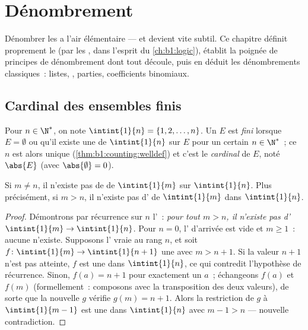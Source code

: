 \chapter{Dénombrement}\label{ch:b1:counting}

Dénombrer les  a l'air élémentaire --- et devient vite
subtil. Ce chapitre définit proprement le  (par les ,
dans l'esprit du \cref{ch:b1:logic}), établit la poignée de principes de
dénombrement dont tout découle, puis en déduit les dénombrements
classiques~: listes, , parties, coefficients binomiaux.

\section{Cardinal des ensembles finis}

\begin{definition}\label{def:b1:counting:card}
Pour $n \in \N^*$, on note $\intint{1}{n} = \{1, 2, \dots,
n\}$. Un  $E$ est \emph{fini} lorsque $E = \emptyset$
ou qu'il existe une  de $\intint{1}{n}$ sur $E$ pour
un certain $n \in \N^*$~; ce $n$ est alors unique (\cref{thm:b1:counting:welldef})
et c'est le \emph{cardinal} de $E$, noté
$\abs{E}$ (avec $\abs{\emptyset} = 0$).
\end{definition}

\begin{theorem}\label{thm:b1:counting:welldef}
Si $m \neq n$, il n'existe pas de  de $\intint{1}{m}$
sur $\intint{1}{n}$. Plus précisément, si $m > n$, il n'existe
pas d' de $\intint{1}{m}$ dans $\intint{1}{n}$.
\end{theorem}

\begin{proof}
Démontrons par récurrence sur $n$ l'~: \emph{pour tout $m > n$,
il n'existe pas d' $\intint{1}{m} \to \intint{1}{n}$}. Pour $n = 0$, l' d'arrivée est vide et $m \geq 1$~: aucune
 n'existe. Supposons l' vraie au rang $n$, et soit $f \colon
\intint{1}{m} \to \intint{1}{n+1}$ une
 avec $m > n + 1$. Si la valeur $n + 1$ n'est pas atteinte, $f$
est une  dans $\intint{1}{n}$, ce qui contredit l'hypothèse
de récurrence. Sinon, $f(a) = n + 1$ pour exactement un $a$~;
échangeons $f(a)$ et $f(m)$ (formellement~: composons avec la transposition
des deux valeurs), de sorte que la nouvelle  $g$ vérifie $g(m) = n + 1$.
Alors la restriction de $g$ à $\intint{1}{m-1}$ est une
 dans $\intint{1}{n}$ avec $m - 1 > n$ ---
nouvelle contradiction.
\end{proof}

